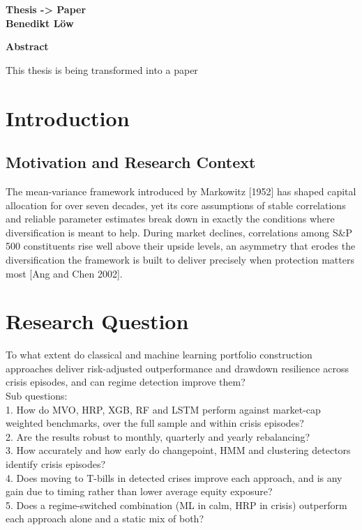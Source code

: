 \documentclass[12pt]{article}
\begin{document}
\begin{titlepage}
    \centering
    \textbf{Thesis -> Paper}\vspace{3cm}\\
    \textbf{Benedikt Löw}\\
\end{titlepage}







\newpage
\pagestyle{plain}
\setcounter{page}{2}
\begin{center}
    \textbf{Abstract}
\end{center}

\noindent

This thesis is being transformed into a paper



\newpage
\pagestyle{plain}
\setcounter{page}{1}
\section{Introduction}
\subsection{Motivation and Research Context}
The mean-variance framework introduced by Markowitz [1952] has shaped 
capital allocation for over seven decades, yet its core assumptions of 
stable correlations and reliable parameter estimates break down in exactly 
the conditions where diversification is meant to help. During market declines, 
correlations among S\&P 500 constituents rise well above their upside levels, 
an asymmetry that erodes the diversification the framework is built to deliver 
precisely when protection matters most [Ang and Chen 2002].

\section{Research Question}
To what extent do classical and machine learning portfolio construction approaches deliver risk-adjusted 
outperformance and drawdown resilience across crisis episodes, and can regime detection improve them?\\

Sub questions:\\
1. How do MVO, HRP, XGB, RF and LSTM perform against market-cap weighted benchmarks, over the full sample 
and within crisis episodes?\\
2. Are the results robust to monthly, quarterly and yearly rebalancing?\\
3. How accurately and how early do changepoint, HMM and clustering detectors identify crisis episodes?\\
4. Does moving to T-bills in detected crises improve each approach, and is any gain due to timing rather 
than lower average equity exposure?\\
5. Does a regime-switched combination (ML in calm, HRP in crisis) outperform each approach alone and a 
static mix of both?
\end{document}
